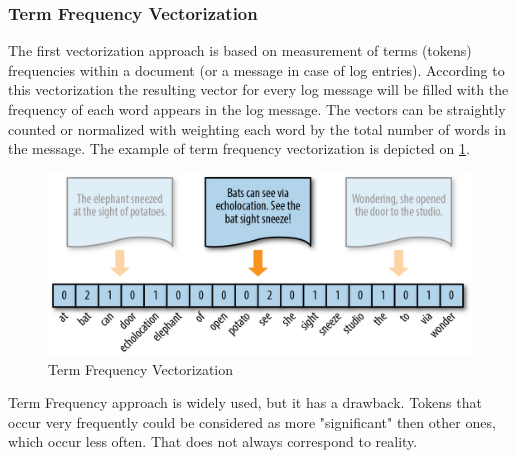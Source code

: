 \documentclass[thesis=M,english]{FITthesis}[2019/12/23]
\begin{document}
\subsubsection{Term Frequency Vectorization}\label{sect:tf-vectorization}
The first vectorization approach is based on measurement of terms (tokens) frequencies within a document (or a message in case of log entries). According to this vectorization the resulting vector for every log message will be filled with the frequency of each word appears in the log message. The vectors can be straightly counted or normalized with weighting each word by the total number of words in the message. The example of term frequency vectorization is depicted on \ref{fig:term-frequency}.

\begin{figure}[h!]\centering
	\includegraphics[scale=0.8]{term-frequency}
	\caption{Term Frequency Vectorization}\label{fig:term-frequency}
\end{figure}

Term Frequency approach is widely used, but it has a drawback. Tokens that occur very frequently could be considered as more "significant" then other ones, which occur less often\cite{vectorization}. That does not always correspond to reality. 
\end{document}
